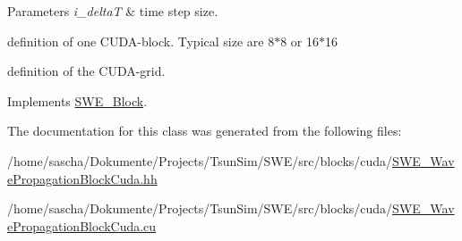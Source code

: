 \begin{DoxyParams}{Parameters}
{\em i\-\_\-delta\-T} & time step size. \\
\hline
\end{DoxyParams}
definition of one C\-U\-D\-A-\/block. Typical size are 8$\ast$8 or 16$\ast$16

definition of the C\-U\-D\-A-\/grid. 

Implements \hyperlink{classSWE__Block_ab2b4b659f23d5d45413dece8d2da3298}{S\-W\-E\-\_\-\-Block}.



The documentation for this class was generated from the following files\-:\begin{DoxyCompactItemize}
\item 
/home/sascha/\-Dokumente/\-Projects/\-Tsun\-Sim/\-S\-W\-E/src/blocks/cuda/\hyperlink{SWE__WavePropagationBlockCuda_8hh}{S\-W\-E\-\_\-\-Wave\-Propagation\-Block\-Cuda.\-hh}\item 
/home/sascha/\-Dokumente/\-Projects/\-Tsun\-Sim/\-S\-W\-E/src/blocks/cuda/\hyperlink{SWE__WavePropagationBlockCuda_8cu}{S\-W\-E\-\_\-\-Wave\-Propagation\-Block\-Cuda.\-cu}\end{DoxyCompactItemize}
